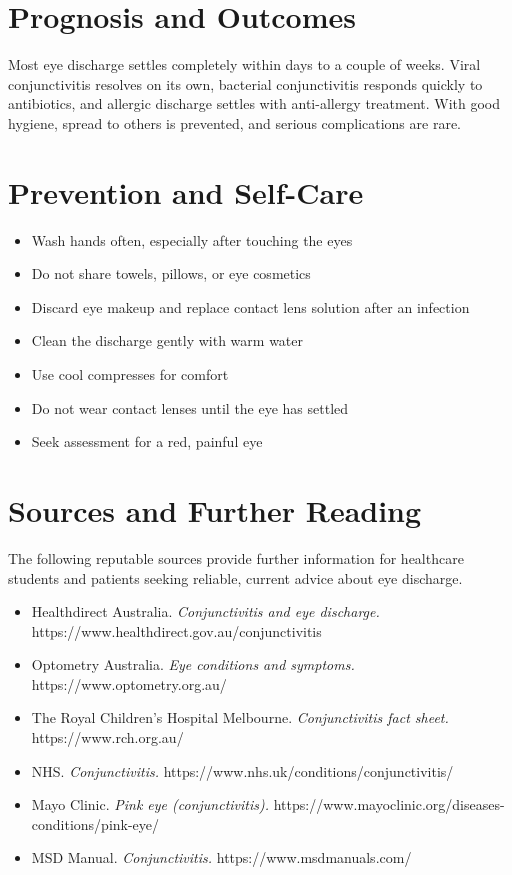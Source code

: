 \section*{Prognosis and Outcomes}
Most eye discharge settles completely within days to a couple of weeks. Viral conjunctivitis resolves on its own, bacterial conjunctivitis responds quickly to antibiotics, and allergic discharge settles with anti-allergy treatment. With good hygiene, spread to others is prevented, and serious complications are rare.

\section*{Prevention and Self-Care}
\begin{itemize}
    \item Wash hands often, especially after touching the eyes
    \item Do not share towels, pillows, or eye cosmetics
    \item Discard eye makeup and replace contact lens solution after an infection
    \item Clean the discharge gently with warm water
    \item Use cool compresses for comfort
    \item Do not wear contact lenses until the eye has settled
    \item Seek assessment for a red, painful eye
\end{itemize}

\section*{Sources and Further Reading}
The following reputable sources provide further information for healthcare students and patients seeking reliable, current advice about eye discharge.
\begin{itemize}
    \item Healthdirect Australia. \textit{Conjunctivitis and eye discharge.} https://www.healthdirect.gov.au/conjunctivitis
    \item Optometry Australia. \textit{Eye conditions and symptoms.} https://www.optometry.org.au/
    \item The Royal Children's Hospital Melbourne. \textit{Conjunctivitis fact sheet.} https://www.rch.org.au/
    \item NHS. \textit{Conjunctivitis.} https://www.nhs.uk/conditions/conjunctivitis/
    \item Mayo Clinic. \textit{Pink eye (conjunctivitis).} https://www.mayoclinic.org/diseases-conditions/pink-eye/
    \item MSD Manual. \textit{Conjunctivitis.} https://www.msdmanuals.com/
\end{itemize}
